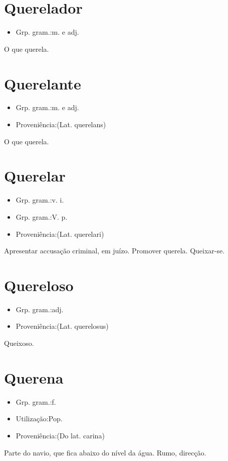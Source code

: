 \section{Querelador}
\begin{itemize}
\item {Grp. gram.:m.  e  adj.}
\end{itemize}
O que querela.
\section{Querelante}
\begin{itemize}
\item {Grp. gram.:m.  e  adj.}
\end{itemize}
\begin{itemize}
\item {Proveniência:(Lat. \textunderscore querelans\textunderscore )}
\end{itemize}
O que querela.
\section{Querelar}
\begin{itemize}
\item {Grp. gram.:v. i.}
\end{itemize}
\begin{itemize}
\item {Grp. gram.:V. p.}
\end{itemize}
\begin{itemize}
\item {Proveniência:(Lat. \textunderscore querelari\textunderscore )}
\end{itemize}
Apresentar accusação criminal, em juízo.
Promover querela.
Queixar-se.
\section{Quereloso}
\begin{itemize}
\item {Grp. gram.:adj.}
\end{itemize}
\begin{itemize}
\item {Proveniência:(Lat. \textunderscore querelosus\textunderscore )}
\end{itemize}
Queixoso.
\section{Querena}
\begin{itemize}
\item {Grp. gram.:f.}
\end{itemize}
\begin{itemize}
\item {Utilização:Pop.}
\end{itemize}
\begin{itemize}
\item {Proveniência:(Do lat. \textunderscore carina\textunderscore )}
\end{itemize}
Parte do navio, que fica abaixo do nível da água.
Rumo, direcção.
